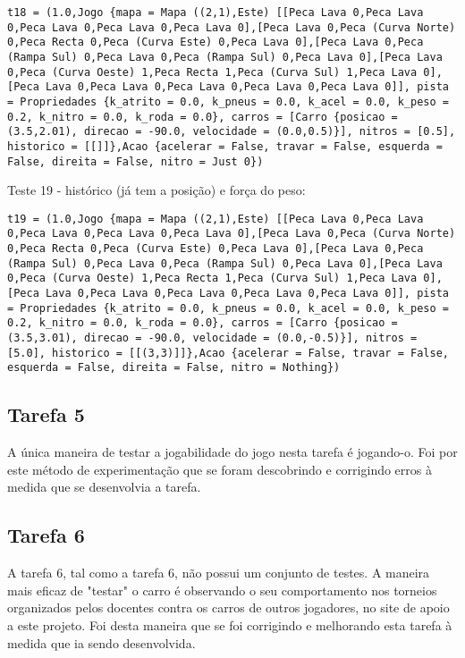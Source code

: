 \documentclass[a4paper]{report}
\begin{document}
\begin{lstlisting}
t18 = (1.0,Jogo {mapa = Mapa ((2,1),Este) [[Peca Lava 0,Peca Lava 0,Peca Lava 0,Peca Lava 0,Peca Lava 0],[Peca Lava 0,Peca (Curva Norte) 0,Peca Recta 0,Peca (Curva Este) 0,Peca Lava 0],[Peca Lava 0,Peca (Rampa Sul) 0,Peca Lava 0,Peca (Rampa Sul) 0,Peca Lava 0],[Peca Lava 0,Peca (Curva Oeste) 1,Peca Recta 1,Peca (Curva Sul) 1,Peca Lava 0],[Peca Lava 0,Peca Lava 0,Peca Lava 0,Peca Lava 0,Peca Lava 0]], pista = Propriedades {k_atrito = 0.0, k_pneus = 0.0, k_acel = 0.0, k_peso = 0.2, k_nitro = 0.0, k_roda = 0.0}, carros = [Carro {posicao = (3.5,2.01), direcao = -90.0, velocidade = (0.0,0.5)}], nitros = [0.5], historico = [[]]},Acao {acelerar = False, travar = False, esquerda = False, direita = False, nitro = Just 0})
\end{lstlisting}

Teste 19 - histórico (já tem a posição) e força do peso:

\begin{lstlisting}
t19 = (1.0,Jogo {mapa = Mapa ((2,1),Este) [[Peca Lava 0,Peca Lava 0,Peca Lava 0,Peca Lava 0,Peca Lava 0],[Peca Lava 0,Peca (Curva Norte) 0,Peca Recta 0,Peca (Curva Este) 0,Peca Lava 0],[Peca Lava 0,Peca (Rampa Sul) 0,Peca Lava 0,Peca (Rampa Sul) 0,Peca Lava 0],[Peca Lava 0,Peca (Curva Oeste) 1,Peca Recta 1,Peca (Curva Sul) 1,Peca Lava 0],[Peca Lava 0,Peca Lava 0,Peca Lava 0,Peca Lava 0,Peca Lava 0]], pista = Propriedades {k_atrito = 0.0, k_pneus = 0.0, k_acel = 0.0, k_peso = 0.2, k_nitro = 0.0, k_roda = 0.0}, carros = [Carro {posicao = (3.5,3.01), direcao = -90.0, velocidade = (0.0,-0.5)}], nitros = [5.0], historico = [[(3,3)]]},Acao {acelerar = False, travar = False, esquerda = False, direita = False, nitro = Nothing})
\end{lstlisting}


\subsection{Tarefa 5}

A única maneira de testar a jogabilidade do jogo nesta tarefa é jogando-o. Foi por este método de experimentação que se foram descobrindo e corrigindo erros à medida que se desenvolvia a tarefa.

\subsection{Tarefa 6}

A tarefa 6, tal como a tarefa 6, não possui um conjunto de testes. A maneira mais eficaz de "testar" o carro é observando o seu comportamento nos torneios organizados pelos docentes contra os carros de outros jogadores, no site de apoio a este projeto. Foi desta maneira que se foi corrigindo e melhorando esta tarefa à medida que ia sendo desenvolvida.
\end{document}

